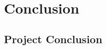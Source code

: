 \chapter{Conclusion}
\label{ch:Conclusion}

\section{Project Conclusion}
\label{sec:Project-Conclusion}

